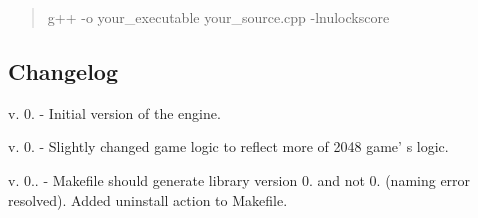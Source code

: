 \begin{quotation}
g++ -\/o your\-\_\-executable your\-\_\-source.\-cpp -\/lnulockscore

\end{quotation}


\subsection*{Changelog }


\begin{DoxyItemize}
\item v. 0. -\/ Initial version of the engine.
\item v. 0. -\/ Slightly changed game logic to reflect more of 2048 game' s logic.
\item v. 0.. -\/ Makefile should generate library version 0. and not 0. (naming error resolved). Added uninstall action to Makefile. 
\end{DoxyItemize}